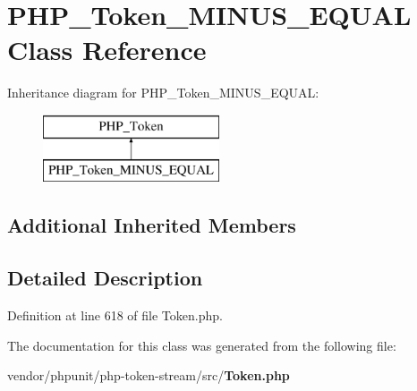 \section{P\+H\+P\+\_\+\+Token\+\_\+\+M\+I\+N\+U\+S\+\_\+\+E\+Q\+U\+A\+L Class Reference}
\label{class_p_h_p___token___m_i_n_u_s___e_q_u_a_l}
Inheritance diagram for P\+H\+P\+\_\+\+Token\+\_\+\+M\+I\+N\+U\+S\+\_\+\+E\+Q\+U\+A\+L\+:\begin{figure}[H]
\begin{center}
\leavevmode
\includegraphics[height=2.000000cm]{class_p_h_p___token___m_i_n_u_s___e_q_u_a_l}
\end{center}
\end{figure}
\subsection*{Additional Inherited Members}


\subsection{Detailed Description}


Definition at line 618 of file Token.\+php.



The documentation for this class was generated from the following file\+:\begin{DoxyCompactItemize}
\item 
vendor/phpunit/php-\/token-\/stream/src/{\bf Token.\+php}\end{DoxyCompactItemize}
